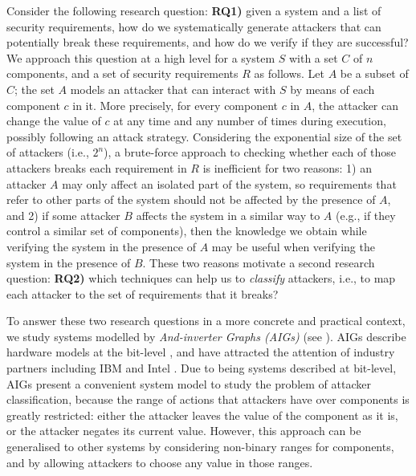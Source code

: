 {Consider the following research question: \textbf{RQ1)} given a system and a list of security requirements, how do we systematically generate attackers that can potentially break these requirements, and how do we verify if they are successful? We approach this question at a high level for a system $S$ with a set $C$ of $n$ components, and a set of security requirements $R$ as follows. Let $A$ be a subset of $C$; the set $A$ models an attacker that can interact with $S$ by means of each component $c$ in it. More precisely, for every component $c$ in $A$, the attacker can change the value of $c$ at any time and any number of times during execution, possibly following an attack strategy. Considering the exponential size of the set of attackers (i.e., $2^{n}$), a brute-force approach to checking whether each of those attackers breaks each requirement in $R$ is inefficient for two reasons: 1) an attacker $A$ may only affect an isolated part of the system, so requirements that refer to other parts of the system should not be affected by the presence of $A$, and 2) if some attacker $B$ affects the system in a similar way to $A$ (e.g., if they control a similar set of components), then the knowledge we obtain while verifying the system in the presence of $A$ may be useful when verifying the system in the presence of $B$. These two reasons motivate a second research question: \textbf{RQ2)} which techniques can help us to \emph{classify} attackers, i.e., to map each attacker to the set of requirements that it breaks? 

To answer these two research questions in a more concrete and practical context, we study systems modelled by \emph{And-inverter Graphs (AIGs)} (see  \cite{AIGs,AIGs2}). AIGs describe hardware models at the bit-level \cite{AIGER}, and have attracted the attention of industry partners including IBM and Intel \cite{HWMCC2014BM}. Due to being systems described at bit-level, AIGs present a convenient system model to study the problem of attacker classification, because the range of actions that attackers have over components is greatly restricted: either the attacker leaves the value of the component as it is, or the attacker negates its current value. However, this approach can be generalised to other systems by considering non-binary ranges for components, and by allowing attackers to choose any value in those ranges.

}
